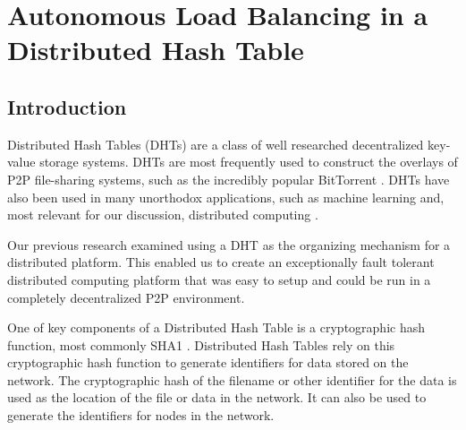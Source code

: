 \chapter{Autonomous Load Balancing in a Distributed Hash Table}
\label{chapter:auto-balance}





\section{Introduction}


Distributed Hash Tables (DHTs) are a class of well researched decentralized key-value storage systems.
DHTs are most frequently used to construct the overlays of P2P file-sharing systems, such as the incredibly popular BitTorrent \cite{bittorrent}.
DHTs have also been used in many unorthodox applications, such as machine learning \cite{liparameter} and, most relevant for our discussion, distributed computing \cite{chordreduce}.

Our previous research \cite{chordreduce} examined using a DHT as the organizing mechanism for a distributed platform.
This enabled us to create an exceptionally fault tolerant distributed computing platform that was easy to setup and could be run in a completely decentralized P2P environment.

One of key components of a Distributed Hash Table is a cryptographic hash function, most commonly SHA1 \cite{sha1}.
Distributed Hash Tables rely on this cryptographic hash function to generate identifiers for data stored on the network.
The cryptographic hash of the filename or other identifier for the data is used as the location of the file or data in the network.
It can also be used to generate the identifiers for nodes in the network.

